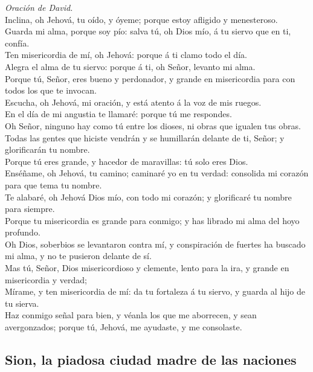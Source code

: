  \emph{Oración de David.}\\
Inclina, oh Jehová, tu oído, y óyeme; porque estoy afligido y
menesteroso.\\
 Guarda mi alma, porque soy pío: salva tú, oh Dios mío, á tu
siervo que en ti, confía.\\
 Ten misericordia de mí, oh Jehová: porque á ti clamo todo
el día.\\
 Alegra el alma de tu siervo: porque á ti, oh Señor, levanto
mi alma.\\
 Porque tú, Señor, eres bueno y perdonador, y grande en
misericordia para con todos los que te invocan.\\
 Escucha, oh Jehová, mi oración, y está atento á la voz de
mis ruegos.\\
 En el día de mi angustia te llamaré: porque tú me
respondes.\\
 Oh Señor, ninguno hay como tú entre los dioses, ni obras
que igualen tus obras.\\
 Todas las gentes que hiciste vendrán y se humillarán
delante de ti, Señor; y glorificarán tu nombre.\\
 Porque tú eres grande, y hacedor de maravillas: tú solo
eres Dios.\\
 Enséñame, oh Jehová, tu camino; caminaré yo en tu verdad:
consolida mi corazón para que tema tu nombre.\\
 Te alabaré, oh Jehová Dios mío, con todo mi corazón; y
glorificaré tu nombre para siempre.\\
 Porque tu misericordia es grande para conmigo; y has
librado mi alma del hoyo profundo.\\
 Oh Dios, soberbios se levantaron contra mí, y conspiración
de fuertes ha buscado mi alma, y no te pusieron delante de sí.\\
 Mas tú, Señor, Dios misericordioso y clemente, lento para
la ira, y grande en misericordia y verdad;\\
 Mírame, y ten misericordia de mí: da tu fortaleza á tu
siervo, y guarda al hijo de tu sierva.\\
 Haz conmigo señal para bien, y véanla los que me
aborrecen, y sean avergonzados; porque tú, Jehová, me ayudaste, y me
consolaste.

\hypertarget{sion-la-piadosa-ciudad-madre-de-las-naciones}{%
\subsection{Sion, la piadosa ciudad madre de las
naciones}\label{sion-la-piadosa-ciudad-madre-de-las-naciones}}

